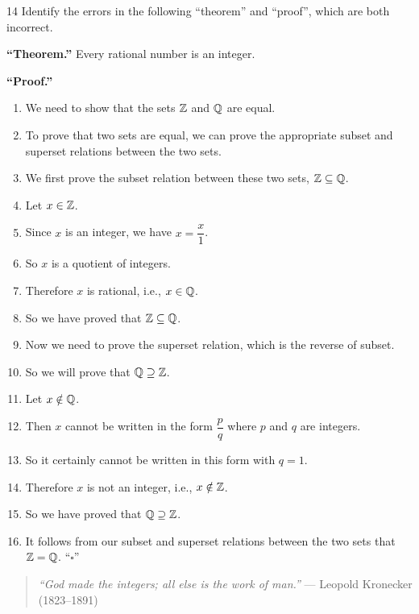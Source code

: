 \documentclass[11pt]{article}
\begin{document}
\begin{exercise}{14}
    Identify the errors in the following ``theorem'' and ``proof'',
    which are both incorrect.

    \medskip
    \textbf{``Theorem.''} Every rational number is an integer.

    \textbf{``Proof.''}
    \begin{enumerate}
        \item We need to show that the sets $\mathbb{Z}$ and $\mathbb{Q}$ are equal.
        \item To prove that two sets are equal, we can prove the
            appropriate subset and superset relations between the two
            sets.
        \item We first prove the subset relation between these two
            sets, $\mathbb{Z} \subseteq \mathbb{Q}$.
        \item Let $x \in \mathbb{Z}$.
        \item Since $x$ is an integer, we have $x = \dfrac{x}{1}$.
        \item So $x$ is a quotient of integers.
        \item Therefore $x$ is rational, i.e., $x \in \mathbb{Q}$.
        \item So we have proved that $\mathbb{Z} \subseteq \mathbb{Q}$.
        \item Now we need to prove the superset relation, which is
            the reverse of subset.
        \item So we will prove that $\mathbb{Q} \supseteq \mathbb{Z}$.
        \item Let $x \notin \mathbb{Q}$.
        \item Then $x$ cannot be written in the form $\dfrac{p}{q}$
            where $p$ and $q$ are integers.
        \item So it certainly cannot be written in this form with
            $q=1$.
        \item Therefore $x$ is not an integer, i.e., $x \notin \mathbb{Z}$.
        \item So we have proved that $\mathbb{Q} \supseteq \mathbb{Z}$.
        \item It follows from our subset and superset relations
            between the two sets that $\mathbb{Z} = \mathbb{Q}$. \hfill ``$\square$''
    \end{enumerate}
    \begin{quote}
        \emph{``God made the integers; all else is the work of man.''}
        \hfill --- Leopold Kronecker (1823--1891)
    \end{quote}
\end{exercise}
\begin{solution}

\end{solution}
\end{document}
